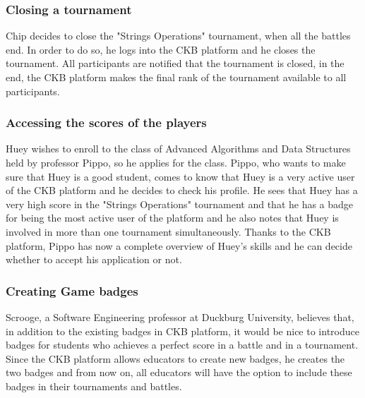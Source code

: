 \subsubsection{Closing a tournament}
Chip decides to close the "Strings Operations" tournament, when all the battles end.
In order to do so, he logs into the CKB platform and he closes the tournament.
All participants are notified that the tournament is closed, in the end, the CKB platform makes the final rank of the tournament available to all participants.

\subsubsection{Accessing the scores of the players}
Huey wishes to enroll to the class of Advanced Algorithms and Data Structures held by professor Pippo, so he applies for the class.
Pippo, who wants to make sure that Huey is a good student, comes to know that Huey is a very active user of the CKB platform and he decides to check his profile.
He sees that Huey has a very high score in the "Strings Operations" tournament and that he has a badge for being the most active user of the platform and he also notes that Huey is involved in more than one tournament simultaneously.
Thanks to the CKB platform, Pippo has now a complete overview of Huey's skills and he can decide whether to accept his application or not.

\subsubsection{Creating Game badges}
Scrooge, a Software Engineering professor at Duckburg University, believes that, in addition to the existing badges in CKB platform, it would be nice to introduce badges for students who achieves a perfect score in a battle and in a tournament.
Since the CKB platform allows educators to create new badges, he creates the two badges and from now on, all educators will have the option to include these badges in their tournaments and battles.

